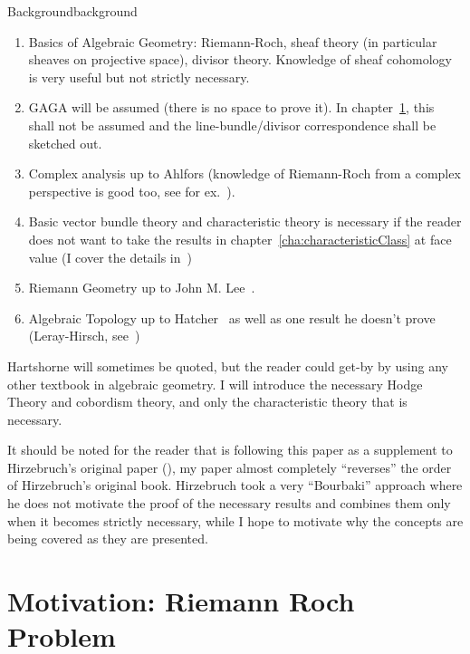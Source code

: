 \documentclass{ut-thesis}
\begin{document}
\begin{titledBox}{Background}{background}
  \begin{enumerate}
  \item Basics of Algebraic Geometry: Riemann-Roch, sheaf theory (in particular sheaves on projective space),
    divisor theory. Knowledge of sheaf cohomology is very useful but not strictly necessary.
  \item GAGA will be assumed (there is no space to prove it). In chapter~\ref{cha:motivation}, this shall not
    be assumed and the line-bundle/divisor correspondence shall be sketched out.
  \item Complex analysis up to Ahlfors (knowledge of Riemann-Roch from a complex perspective is good too,
    see for ex.~\cite{a.griffithsIntroductionAlgebraicCurves}).
  \item Basic vector bundle theory and characteristic theory is necessary if the reader does not want to take the results in
    chapter~\ref{cha:characteristicClass} at face value (I cover the details in~\cite{NateKTheory})
  \item Riemann Geometry up to John M. Lee~\cite{leeIntroductionRiemannianManifolds2018}.
  \item Algebraic Topology up to Hatcher~\cite{hatcherAlgebraicTopology} as well as one result he doesn't prove (Leray-Hirsch,
    see~\cite{NateAlgTop})
\end{enumerate}
\end{titledBox}

Hartshorne will sometimes be quoted, but the reader could get-by by using any other textbook in algebraic
geometry. I will introduce the necessary Hodge Theory and cobordism theory, and only the characteristic theory
that is necessary.

It should be noted for the reader that is following this paper as a supplement to Hirzebruch's original paper
(\cite{hirzebruchTopologicalMethodsAlgebraic1995}), my paper almost completely ``reverses'' the order of
Hirzebruch's original book. Hirzebruch took a very ``Bourbaki'' approach where he does not motivate the proof
of the necessary results and combines them only when it becomes strictly necessary, while I hope to motivate
why the concepts are being covered as they are presented.










\mainmatter
\chapter{Motivation: Riemann Roch Problem}\label{cha:motivation}
\end{document}
